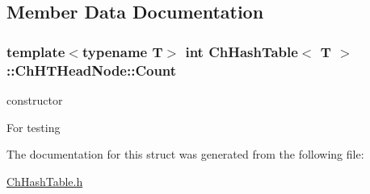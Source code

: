 \subsection{Member Data Documentation}
\hypertarget{structChHashTable_1_1ChHTHeadNode_a2e06f4036a3fedc180c24597e407d257}{
\subsubsection[{Count}]{\setlength{\rightskip}{0pt plus 5cm}template$<$typename T$>$ int {\bf Ch\-Hash\-Table}$<$ T $>$\-::Ch\-H\-T\-Head\-Node\-::\-Count}}\label{structChHashTable_1_1ChHTHeadNode_a2e06f4036a3fedc180c24597e407d257}


constructor 

For testing 

The documentation for this struct was generated from the following file\-:\begin{DoxyCompactItemize}
\item 
\hyperlink{ChHashTable_8h}{Ch\-Hash\-Table.\-h}\end{DoxyCompactItemize}
